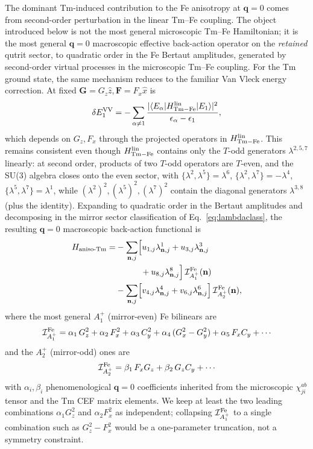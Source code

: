 \documentclass[reprint,amsmath,amssymb,aps,prb,longbibliography]{revtex4-2}
\newcommand{\bfF}{\mathbf{F}}
\newcommand{\bfG}{\mathbf{G}}
\begin{document}
The dominant Tm-induced contribution to the Fe anisotropy at
$\mathbf q=0$ comes from second-order perturbation in the linear Tm--Fe
coupling. The object introduced below is not the most general microscopic
Tm--Fe Hamiltonian; it is the most general $\mathbf q=0$ macroscopic
effective back-action operator on the \emph{retained} qutrit sector, to
quadratic order in the Fe Bertaut amplitudes, generated by second-order
virtual processes in the microscopic Tm--Fe coupling. For the Tm ground
state, the same mechanism reduces to the familiar Van Vleck
energy correction. At fixed $\bfG=
G_z\hat z, \bfF=F_x\hat x$ is
\begin{equation}
\delta E^{\rm VV}_1 = -\sum_{\alpha\neq 1}\frac{|\langle E_\alpha|H_{\rm Tm-Fe}^{\rm lin}|E_1\rangle|^2}
{\epsilon_\alpha - \epsilon_1},
\label{eq:VVE1}
\end{equation}
which depends on $G_z, F_x$ through the projected operators in
$H_{\rm Tm-Fe}^{\rm lin}$. This remains consistent even though
$H_{\rm Tm-Fe}^{\rm lin}$ contains only the $T$-odd generators
$\lambda^{2,5,7}$ linearly: at second order, products of two $T$-odd
operators are $T$-even, and the SU(3) algebra closes onto the even sector,
with $\{\lambda^2,\lambda^5\}=\lambda^6$,
$\{\lambda^2,\lambda^7\}=-\lambda^4$,
$\{\lambda^5,\lambda^7\}=\lambda^1$, while
$(\lambda^2)^2,(\lambda^5)^2,(\lambda^7)^2$ contain the diagonal
generators $\lambda^{3,8}$ (plus the identity). Expanding to quadratic order in the Bertaut
amplitudes and decomposing in the mirror sector classification of
Eq.~\eqref{eq:lambdaclass}, the resulting $\mathbf q=0$ macroscopic
back-action functional is
\begin{equation}
\begin{aligned}
H_{\rm aniso\text{-}Tm} = &-\sum_{\mathbf n,j}\Bigl[
u_{1,j}\lambda^1_{\mathbf n,j} + u_{3,j}\lambda^3_{\mathbf n,j}\\
&\qquad\quad{} + u_{8,j}\lambda^8_{\mathbf n,j}
\Bigr]\,\mathcal I^{\rm Fe}_{A_1^+}(\mathbf n)\\
&- \sum_{\mathbf n,j}\Bigl[
v_{4,j}\lambda^4_{\mathbf n,j} + v_{6,j}\lambda^6_{\mathbf n,j}
\Bigr]\,\mathcal I^{\rm Fe}_{A_2^+}(\mathbf n),
\end{aligned}
\label{eq:Hanisogen}
\end{equation}
where the most general $A_1^+$ (mirror-even) Fe bilinears are
\begin{equation}
\mathcal I^{\rm Fe}_{A_1^+} = \alpha_1\,G_z^2 + \alpha_2\,F_x^2 + \alpha_3\,C_y^2
+ \alpha_4\,(G_x^2 - G_y^2) + \alpha_5\,F_x C_y + \cdots
\label{eq:IA1}
\end{equation}
and the $A_2^+$ (mirror-odd) ones are
\begin{equation}
\mathcal I^{\rm Fe}_{A_2^+} = \beta_1\,F_x G_z + \beta_2\,G_z C_y + \cdots
\label{eq:IA2}
\end{equation}
with $\alpha_i, \beta_i$ phenomenological $\mathbf q=0$ coefficients
inherited from the microscopic $\chi^{ab}_{ji}$ tensor and the Tm CEF
matrix elements. We keep at least the two
leading combinations $\alpha_1 G_z^2$ and $\alpha_2 F_x^2$ as independent;
collapsing $\mathcal I^{\rm Fe}_{A_1^+}$ to a single combination such as
$G_z^2 - F_x^2$ would be a one-parameter truncation, not a symmetry
constraint.
\end{document}
